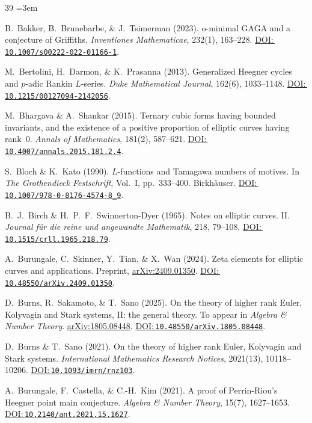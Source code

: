 \documentclass[aps,prd,twocolumn,superscriptaddress,nofootinbib,floatfix]{revtex4-2}
\newcommand{\doilink}[1]{\href{https://doi.org/#1}{DOI:\,\nolinkurl{#1}}}
\theoremstyle{definition}
\theoremstyle{remark}
\begin{document}
\begin{thebibliography}{39}
\sloppy
\emergencystretch=3em
\setlength{\itemsep}{0pt}
\setlength{\parskip}{0pt}

B.~Bakker, B.~Brunebarbe, \& J.~Tsimerman (2023).
o-minimal GAGA and a conjecture of Griffiths.
\textit{Inventiones Mathematicae}, 232(1), 163--228.
\doilink{10.1007/s00222-022-01166-1}.

M.~Bertolini, H.~Darmon, \& K.~Prasanna (2013).
Generalized Heegner cycles and $p$-adic Rankin $L$-series.
\textit{Duke Mathematical Journal}, 162(6), 1033--1148.
\doilink{10.1215/00127094-2142056}.

M.~Bhargava \& A.~Shankar (2015).
Ternary cubic forms having bounded invariants, and the existence of a positive proportion of elliptic curves having rank~0.
\textit{Annals of Mathematics}, 181(2), 587--621.
\doilink{10.4007/annals.2015.181.2.4}.

S.~Bloch \& K.~Kato (1990).
$L$-functions and Tamagawa numbers of motives.
In \textit{The Grothendieck Festschrift}, Vol.~I, pp.\ 333--400. Birkhäuser.
\doilink{10.1007/978-0-8176-4574-8\_9}.

B.~J.~Birch \& H.~P.~F.~Swinnerton-Dyer (1965).
Notes on elliptic curves. II.
\textit{Journal für die reine und angewandte Mathematik}, 218, 79--108.
\doilink{10.1515/crll.1965.218.79}.

A.~Burungale, C.~Skinner, Y.~Tian, \& X.~Wan (2024).
Zeta elements for elliptic curves and applications.
Preprint, \href{https://arxiv.org/abs/2409.01350}{arXiv:2409.01350}.
\doilink{10.48550/arXiv.2409.01350}.

D.~Burns, R.~Sakamoto, \& T.~Sano (2025).
On the theory of higher rank Euler, Kolyvagin and Stark systems, II: the general theory.
To appear in \textit{Algebra \& Number Theory}.
\href{https://arxiv.org/abs/1805.08448}{arXiv:1805.08448}.
\doilink{10.48550/arXiv.1805.08448}.

D.~Burns \& T.~Sano (2021).
On the theory of higher rank Euler, Kolyvagin and Stark systems.
\textit{International Mathematics Research Notices}, 2021(13), 10118--10206.
\doilink{10.1093/imrn/rnz103}.

A.~Burungale, F.~Castella, \& C.-H.~Kim (2021).
A proof of Perrin-Riou's Heegner point main conjecture.
\textit{Algebra \& Number Theory}, 15(7), 1627--1653.
\doilink{10.2140/ant.2021.15.1627}.


\end{thebibliography}
\end{document}
